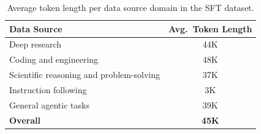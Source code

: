 \begin{table}[ht]
\centering
\caption{Average token length per data source domain in the SFT dataset.}
\label{tab:sft_data_stats}
\begin{tabular}{lc}
\toprule
\textbf{Data Source} & \textbf{Avg.\ Token Length} \\
\midrule
Deep research & 44K \\
Coding and engineering & 48K \\
Scientific reasoning and problem-solving & 37K \\
Instruction following & 3K \\
General agentic tasks & 39K \\
\midrule
\textbf{Overall} & \textbf{45K} \\
\bottomrule
\end{tabular}
\end{table}